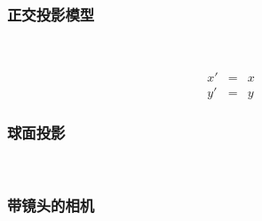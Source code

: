 \documentclass{beamer}
\begin{document}
{{{{\begin{frame}
  \
  
  \
  
  \quad{}
\end{frame}}{\begin{frame}
  \frametitle{正交投影模型}
  
  \
  
  
  \begin{eqnarray*}
    x' & = & x\\
    y' & = & y
  \end{eqnarray*}
\end{frame}}{\begin{frame}
  \frametitle{球面投影}
  
  \
  
  {\hspace{3em}}
\end{frame}}{\begin{frame}
  \frametitle{带镜头的相机}
  

\end{frame}}}}}
\end{document}
